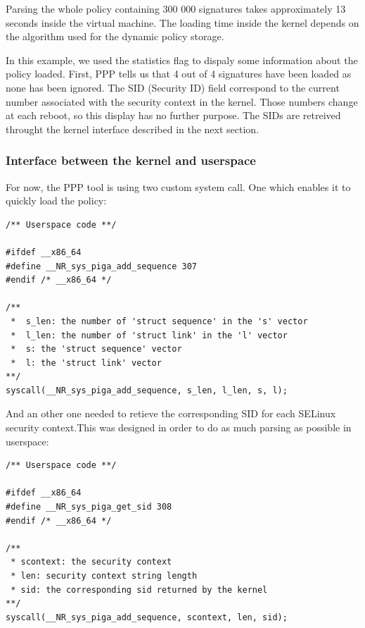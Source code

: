 \documentclass[pdftex,a4paper,titlepage,11pt]{article}
\begin{document}
\medskip

Parsing the whole policy containing 300 000 signatures takes approximately 13
seconds inside the virtual machine. The loading time inside the kernel depends
on the algorithm used for the dynamic policy storage.

\bigskip

In this example, we used the statistics flag to dispaly some information about
the policy loaded. First, PPP tells us that 4 out of 4 signatures have been
loaded as none has been ignored. The SID (Security ID) field correspond to the
current number associated with the security context in the kernel. Those numbers
change at each reboot, so this display has no further purpose. The SIDs are
retreived throught the kernel interface described in the next section.

\subsubsection{Interface between the kernel and userspace}

For now, the PPP tool is using two custom system call. One which enables it to
quickly load the policy:

\begin{lstlisting}
/** Userspace code **/

#ifdef __x86_64
#define __NR_sys_piga_add_sequence 307
#endif /* __x86_64 */

/**
 *  s_len: the number of 'struct sequence' in the 's' vector
 *  l_len: the number of 'struct link' in the 'l' vector
 *  s: the 'struct sequence' vector
 *  l: the 'struct link' vector
**/
syscall(__NR_sys_piga_add_sequence, s_len, l_len, s, l);
\end{lstlisting}

\medskip

And an other one needed to retieve the corresponding SID for each SELinux
security context.This was designed in order to do as much parsing as possible in
userspace:

\begin{lstlisting}
/** Userspace code **/

#ifdef __x86_64
#define __NR_sys_piga_get_sid 308
#endif /* __x86_64 */

/**
 * scontext: the security context
 * len: security context string length
 * sid: the corresponding sid returned by the kernel
**/
syscall(__NR_sys_piga_add_sequence, scontext, len, sid);
\end{lstlisting}
\end{document}
